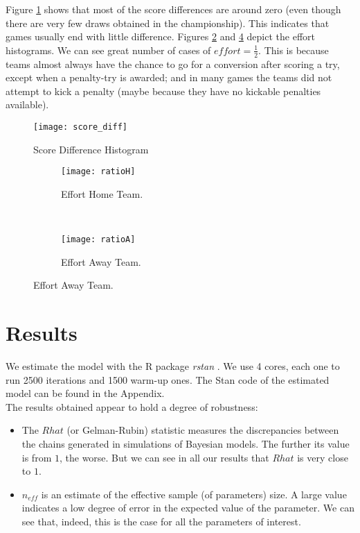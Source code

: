 \documentclass[]{article}
\begin{document}


Figure \ref{fig:score_diff} shows that most of the score differences are around zero (even though there are very few draws obtained in the championship). This indicates that games usually end with little difference. Figures \ref{fig:ratioH} and \ref{fig:ratioA} depict the effort histograms. We can see great number of cases of $effort=\frac{1}{2}$. This is because teams almost always have the chance to go for a conversion after scoring a try, except when a penalty-try is awarded; and in many games the teams did not attempt to kick a penalty (maybe because they have no kickable penalties available).

\begin{figure}[hbt!]
	\centering
	\caption{Score Difference Histogram}
	\texttt{[image: score\_diff]}
	\label{fig:score_diff}
	
\end{figure}


\begin{figure}[hbt!]
	\centering
	\caption{Effort Histograms}		
	\begin{subfigure}[t]{0.47\textwidth}
		\centering
		\scriptsize
		\texttt{[image: ratioH]}
		\caption{Effort Home Team. \label{fig:ratioH}}
	\end{subfigure}%
	~ 
	\begin{subfigure}[t]{0.47\textwidth}
		\centering
		\scriptsize
		\texttt{[image: ratioA]}
		\caption{Effort Away Team. \label{fig:ratioA}}
	\end{subfigure}
\end{figure}

\section{Results}

We estimate the model with the R package \textit{rstan} \cite{stanrstan}. We use 4 cores, each one to run 2500 iterations and 1500 warm-up ones. The Stan code of the estimated model can be found in the Appendix.\\
 
The results obtained appear to hold a degree of robustness: 
\begin{itemize}
\item The $Rhat$ (or Gelman-Rubin) statistic measures the discrepancies between the chains generated in simulations of Bayesian models. The further its value is from $1$, the worse. But we can see in all our results that $Rhat$ is very close to $1$.
\item $n_{eff}$ is an estimate of the effective sample (of parameters) size. A large value indicates a low degree of error in the expected value of the parameter. We can see that, indeed, this is the case for all the parameters of interest.
\end{itemize}
\end{document}
